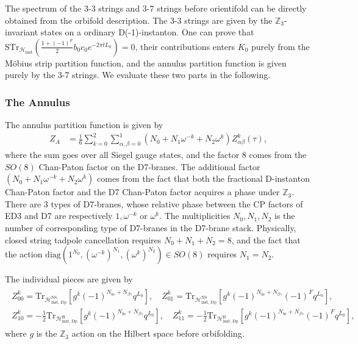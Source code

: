 \documentclass[12pt]{article}
\newcommand{\ie}{\begin{equation}\begin{aligned}}
\newcommand{\fe}{\end{aligned}\end{equation}}
\begin{document}
The spectrum of the 3-3 strings and 3-7 strings before orientifold can be directly obtained from the orbifold description. The 3-3 strings are given by the $\mathbb{Z}_3$-invariant states on a ordinary D(-1)-instanton. One can prove that $\mathrm{STr}_{\mathcal{H}_\text{inst}}(\frac{1+(-1)^F}{2}b_0c_0 e^{-2\pi t L_0})=0$, their contributions enters $K_0$ purely from the M\"obius strip partition function, and the annulus partition function is given purely by the 3-7 strings. We evaluate these two parts in the following.

\subsubsection*{The Annulus}

The annulus partition function is given by
\ie
Z_{A} &= \frac{1}{6} \sum_{k=0}^2 \sum_{\alpha, \beta=0}^1 (N_0+N_1\omega^{-k}+N_2\omega^k)Z_{\alpha\beta}^{k}(\tau),
\fe
where the sum goes over all Siegel gauge states, and the factor 8 comes from the $SO(8)$ Chan-Paton factor on the D7-branes. The additional factor $(N_0+N_1\omega^{-k}+N_2\omega^k)$ comes from the fact that both the fractional D-instanton Chan-Paton factor and the D7 Chan-Paton factor acquires a phase under $\mathbb{Z}_3$. There are 3 types of D7-branes, whose relative phase between the CP factors of ED3 and D7 are respectively $1, \omega^{-k}$ or $\omega^k$. The multiplicities $N_0, N_1, N_2$ is the number of corresponding type of D7-branes in the D7-brane stack. Physically, closed string tadpole cancellation requires $N_0+N_1+N_2=8$, and the fact that the action $\mathrm{diag}(1^{N_0}, (\omega^{-k})^{N_1}, (\omega^k)^{N_2})\in SO(8)$ requires $N_1=N_2$.

The individual pieces are given by
\ie \begin{gathered}
Z_{00}^k = \mathrm{Tr}_{\mathcal{H}^{\text{NS}}_{\text{inst, Dp}}}[g^k(-1)^{N_{bc}+N_{\beta\gamma}} q^{L_0}],\quad Z_{01}^k = \mathrm{Tr}_{\mathcal{H}^{\text{NS}}_{\text{inst, Dp}}}[g^k(-1)^{N_{bc}+N_{\beta\gamma}}(-1)^Fq^{L_0}],\\
Z_{10}^k= -\frac{1}{2}\mathrm{Tr}_{ \mathcal{H}^{\text{R}}_{\text{inst, Dp}}}[g^k(-1)^{N_{bc}+N_{\beta\gamma}}q^{L_0}],\quad Z_{11}^k = -\frac{1}{2}\mathrm{Tr}_{\mathcal{H}^{\text{R}}_{\text{inst, Dp}}}[g^k(-1)^{N_{bc}+N_{\beta\gamma}} (-1)^F q^{L_0}],
\end{gathered}\fe
where $g$ is the $\mathbb{Z}_3$ action on the Hilbert space before orbifolding.
\end{document}

